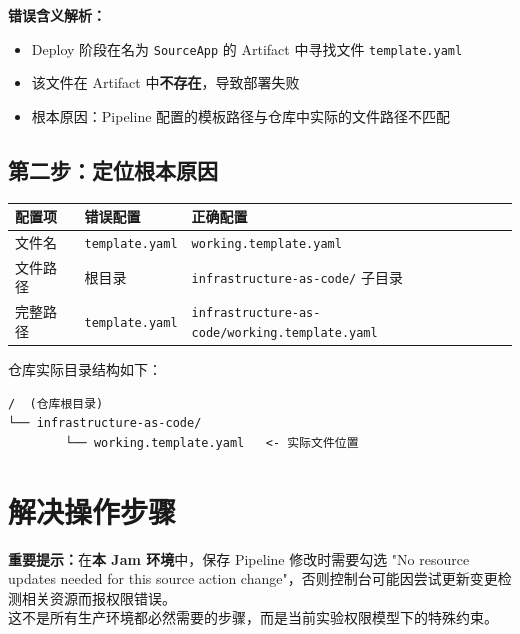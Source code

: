 \documentclass[12pt, a4paper]{article}
\begin{document}
\textbf{错误含义解析：}

\begin{itemize}[leftmargin=2em]
  \item Deploy 阶段在名为 \texttt{SourceApp} 的 Artifact 中寻找文件 \texttt{template.yaml}
  \item 该文件在 Artifact 中\textbf{不存在}，导致部署失败
  \item 根本原因：Pipeline 配置的模板路径与仓库中实际的文件路径不匹配
\end{itemize}

\subsection{第二步：定位根本原因}

\begin{tabularx}{\textwidth}{lXX}
  \toprule
  \textbf{配置项} & \textbf{错误配置} & \textbf{正确配置} \\
  \midrule
  文件名 & \texttt{template.yaml} & \texttt{working.template.yaml} \\
  文件路径 & 根目录 & \texttt{infrastructure-as-code/} 子目录 \\
  完整路径 & \texttt{template.yaml} & \texttt{infrastructure-as-code/working.template.yaml} \\
  \bottomrule
\end{tabularx}

\vspace{0.5cm}

仓库实际目录结构如下：

\begin{lstlisting}
/  (仓库根目录)
└── infrastructure-as-code/
        └── working.template.yaml   <- 实际文件位置
\end{lstlisting}

\newpage

\section{解决操作步骤}

\begin{warnbox}
\textbf{重要提示：}在\textbf{本 Jam 环境}中，保存 Pipeline 修改时需要勾选
"No resource updates needed for this source action change"，否则控制台可能因尝试更新变更检测相关资源而报权限错误。\\
这不是所有生产环境都必然需要的步骤，而是当前实验权限模型下的特殊约束。
\end{warnbox}
\end{document}
